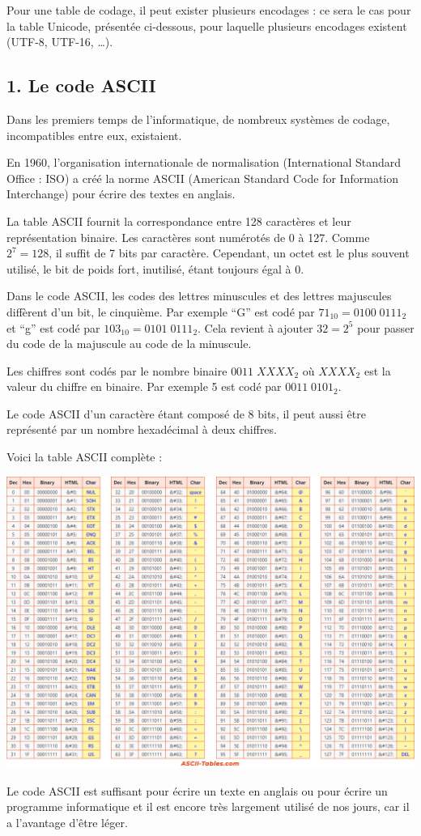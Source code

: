 \documentclass[11pt,a4paper]{article}
\begin{document}
Pour une table de codage, il peut exister plusieurs encodages : ce sera
le cas pour la table Unicode, présentée ci-dessous, pour laquelle
plusieurs encodages existent (UTF-8, UTF-16, \ldots).

\hypertarget{le-code-ascii}{%
\subsection*{1. Le code ASCII}\label{le-code-ascii}}

Dans les premiers temps de l'informatique, de nombreux systèmes de
codage, incompatibles entre eux, existaient.

En 1960, l'organisation internationale de normalisation (International
Standard Office : ISO) a créé la norme ASCII (American Standard Code for
Information Interchange) pour écrire des textes en anglais.

La table ASCII fournit la correspondance entre 128 caractères et leur
représentation binaire. Les caractères sont numérotés de 0 à 127. Comme
\(2^7=128\), il suffit de 7 bits par caractère. Cependant, un octet est
le plus souvent utilisé, le bit de poids fort, inutilisé, étant toujours
égal à 0.

Dans le code ASCII, les codes des lettres minuscules et des lettres
majuscules diffèrent d'un bit, le cinquième. Par exemple ``G'' est codé
par \(71_{10}=0100\;0111_2\) et ``g'' est codé par
\(103_{10}=0101\;0111_2\). Cela revient à ajouter \(32=2^5\) pour passer
du code de la majuscule au code de la minuscule.

Les chiffres sont codés par le nombre binaire \(0011\;XXXX_2\) où
\(XXXX_2\) est la valeur du chiffre en binaire. Par exemple 5 est codé
par \(0011\;0101_2\).

Le code ASCII d'un caractère étant composé de 8 bits, il peut aussi être
représenté par un nombre hexadécimal à deux chiffres.

\newpage

  

Voici la table ASCII complète :
\begin{center}
\includegraphics[scale=0.3]{../../../assets/images/table_ASCII.png}
\end{center}
Le code ASCII est suffisant pour écrire un texte en anglais ou pour
écrire un programme informatique et il est encore très largement utilisé
de nos jours, car il a l'avantage d'être léger.
\end{document}
